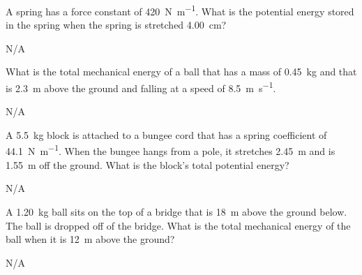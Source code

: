 \begin{question}[ID=energy-C-Q02,topic=energy,difficulty=C]
    A spring has a force constant of \SI{420}{\newton\per\meter}.
    What is the potential energy stored in the spring when the
        spring is stretched \SI{4.00}{\centi\meter}?
\end{question}
\begin{solution}
    N/A
\end{solution}


\begin{question}[ID=energy-C-Q03,topic=energy,difficulty=C]
    What is the total mechanical energy of a ball that has a mass
        of \SI{0.45}{\kilo\gram} and that is \SI{2.3}{\meter}
        above the ground and falling at a speed
        of \SI{8.5}{\meter\per\second}.
\end{question}
\begin{solution}
    N/A
\end{solution}


\begin{question}[ID=energy-C-Q04,topic=energy,difficulty=C]
    A \SI{5.5}{\kilo\gram} block is attached to a bungee cord
        that has a spring coefficient of \SI{44.1}{\newton\per\meter}.
    When the bungee hangs from a pole, it stretches \SI{2.45}{\meter}
        and is \SI{1.55}{\meter} off the ground.
    What is the block's total potential energy?
\end{question}
\begin{solution}
    N/A
\end{solution}


\begin{question}[ID=energy-C-Q05,topic=energy,difficulty=C]
    A \SI{1.20}{\kilo\gram} ball sits on the top of a bridge that
        is \SI{18}{\meter} above the ground below.
    The ball is dropped off of the bridge.
    What is the total mechanical energy of the ball when it is
        \SI{12}{\meter} above the ground?
\end{question}
\begin{solution}
    N/A
\end{solution}


\endinput

